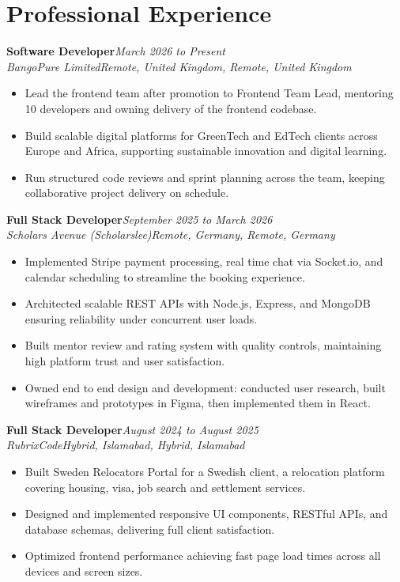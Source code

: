 \documentclass[11pt,letterpaper]{article}
\newcommand{\entry}[4]{%
  \textbf{#1}\hfill\textit{#2}\\
  \textit{#3\ifx\relax#4\relax\else, #4\fi}\\[0.14em]}
\begin{document}
\section{Professional Experience}
\entry{Software Developer}{March 2026 to Present}{BangoPure Limited}{Remote, United Kingdom}
\begin{itemize}
  \item Lead the frontend team after promotion to Frontend Team Lead, mentoring 10 developers and owning delivery of the frontend codebase.
  \item Build scalable digital platforms for GreenTech and EdTech clients across Europe and Africa, supporting sustainable innovation and digital learning.
  \item Run structured code reviews and sprint planning across the team, keeping collaborative project delivery on schedule.
\end{itemize}\vspace{0.4em}
\entry{Full Stack Developer}{September 2025 to March 2026}{Scholars Avenue (Scholarslee)}{Remote, Germany}
\begin{itemize}
  \item Implemented Stripe payment processing, real time chat via Socket.io, and calendar scheduling to streamline the booking experience.
  \item Architected scalable REST APIs with Node.js, Express, and MongoDB ensuring reliability under concurrent user loads.
  \item Built mentor review and rating system with quality controls, maintaining high platform trust and user satisfaction.
  \item Owned end to end design and development: conducted user research, built wireframes and prototypes in Figma, then implemented them in React.
\end{itemize}\vspace{0.4em}
\entry{Full Stack Developer}{August 2024 to August 2025}{RubrixCode}{Hybrid, Islamabad}
\begin{itemize}
  \item Built Sweden Relocators Portal for a Swedish client, a relocation platform covering housing, visa, job search and settlement services.
  \item Designed and implemented responsive UI components, RESTful APIs, and database schemas, delivering full client satisfaction.
  \item Optimized frontend performance achieving fast page load times across all devices and screen sizes.
\end{itemize}
\end{document}
